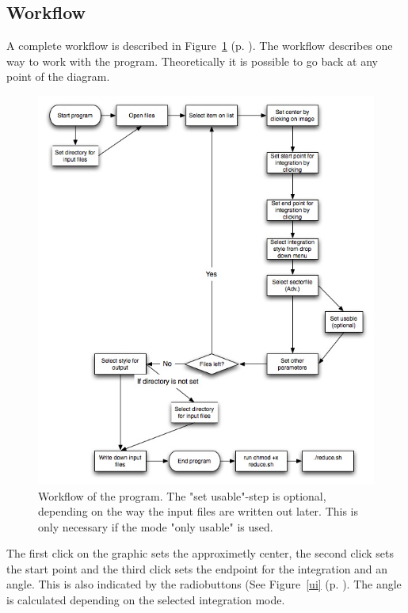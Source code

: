 \subsection{Workflow}
A complete workflow is described in Figure~\ref{workflow} (p. \pageref{workflow}). The workflow describes one way to work with the program. Theoretically it is possible to go back at any point of the diagram. 

\begin{figure}
\includegraphics[width=12cm]{diagram}
\caption{Workflow of the program. The "set usable"-step is optional, depending on the way the input files are written out later. This is only necessary if the mode "only usable" is used.  }
\label{workflow} 
\end{figure} 
The first click on the graphic sets the approximetly center, the second click sets the start point and the third click sets the endpoint for the integration and an angle. This is also indicated by the radiobuttons (See Figure~\ref{ui} (p. \pageref{ui}). The angle is calculated depending on the selected integration mode.

